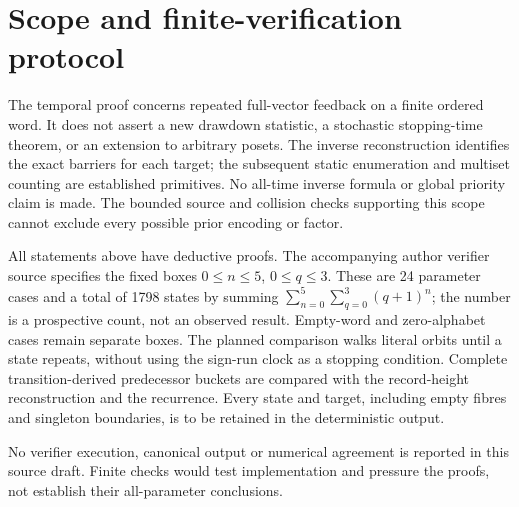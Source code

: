\section{Scope and finite-verification protocol}

The temporal proof concerns repeated full-vector feedback on a finite
ordered word. It does not assert a new drawdown statistic, a stochastic
stopping-time theorem, or an extension to arbitrary posets. The inverse
reconstruction identifies the exact barriers for each target; the
subsequent static enumeration and multiset counting are established
primitives. No all-time inverse formula or global priority claim is made.
The bounded source and collision checks supporting this scope cannot
exclude every possible prior encoding or factor.

All statements above have deductive proofs. The accompanying author
verifier source specifies the fixed boxes $0\le n\le5$, $0\le q\le3$.
These are 24 parameter cases and a total of 1798 states by summing
$\sum_{n=0}^{5}\sum_{q=0}^{3}(q+1)^n$; the number is a prospective
count, not an observed result. Empty-word and zero-alphabet cases remain
separate boxes. The planned comparison walks literal orbits until a
state repeats, without using the sign-run clock as a stopping condition.
Complete transition-derived predecessor buckets are compared with the
record-height reconstruction and the recurrence. Every state and target,
including empty fibres and singleton boundaries, is to be retained in
the deterministic output.

No verifier execution, canonical output or numerical agreement is
reported in this source draft. Finite checks would test implementation
and pressure the proofs, not establish their all-parameter conclusions.
